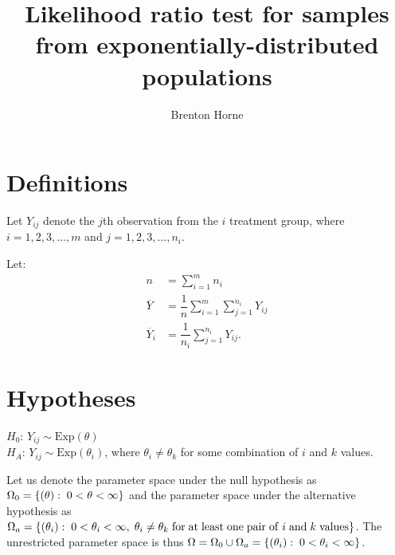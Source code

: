 \documentclass[12pt,a4paper,openright]{article}
\title{Likelihood ratio test for samples from exponentially-distributed populations}
\author{Brenton Horne}
\newcommand{\Exp}{\mathrm{Exp}}
\begin{document}
	\maketitle
	\tableofcontents
	\newpage

    \section{Definitions}
    Let $Y_{ij}$ denote the $j$th observation from the $i$ treatment group, where $i=1, 2, 3, ..., m$ and $j=1, 2, 3, ..., n_i$. 

    Let:
	\begin{align*}
		n &= \sum_{i=1}^m n_i \\
		\overline{Y} &= \dfrac{1}{n} \sum_{i=1}^m \sum_{j=1}^{n_i} Y_{ij} \\
		\overline{Y}_i &= \dfrac{1}{n_i} \sum_{j=1}^{n_i} Y_{ij}.
	\end{align*}

    \section{Hypotheses}
    $H_0$: $Y_{ij} \sim \Exp(\theta)$ \\
    $H_A$: $Y_{ij} \sim \Exp(\theta_i)$, where $\theta_i \neq \theta_k$ for some combination of $i$ and $k$ values.

    Let us denote the parameter space under the null hypothesis as $\Omega_0 = \left\{(\theta): \hspace{0.1cm} 0 < \theta < \infty\right\}$ and the parameter space under the alternative hypothesis as $\Omega_a = \left\{(\theta_i): \hspace{0.1cm} 0 < \theta_i < \infty, \hspace{0.1cm}\theta_i \neq \theta_k \hspace{0.1cm}\mathrm{for}\hspace{0.1cm}\mathrm{at}\hspace{0.1cm}\mathrm{least}\hspace{0.1cm}\mathrm{one}\hspace{0.1cm}\mathrm{pair}\hspace{0.1cm}\mathrm{of}\hspace{0.1cm}i\hspace{0.1cm}\mathrm{and}\hspace{0.1cm}k \hspace{0.1cm}\mathrm{values}\right\}$. The unrestricted parameter space is thus $\Omega = \Omega_0 \cup \Omega_a = \left\{(\theta_i): \hspace{0.1cm} 0 < \theta_i < \infty\right\}$.
\end{document}
